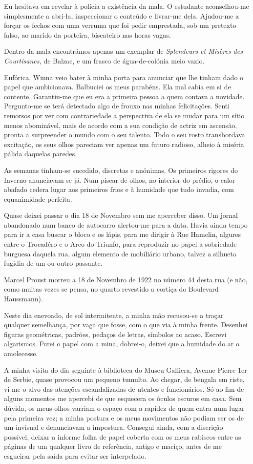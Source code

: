 Eu hesitava em revelar à polícia a existência da mala. O estudante
aconselhou-me simplesmente a abri-la, inspeccionar o conteúdo e
livrar-me dela. Ajudou-me a forçar os fechos com
uma verruma que foi pedir emprestada, sob um pretexto falso, ao marido
da porteira, biscateiro nas horas vagas.

Dentro da mala encontrámos apenas um exemplar de \emph{Splendeurs et
Misères des Courtisanes, }de Balzac, e um frasco de água-de-colónia meio
vazio.

Eufórica, Winna veio bater à minha porta para anunciar que lhe tinham
dado o papel que ambicionava. Balbuciei os meus parabéns. Ela mal cabia
em si de contente. Garantiu-me que eu era a primeira pessoa a quem contava a novidade. Pergunto-me
se terá detectado algo de frouxo nas minhas felicitações. Senti remorsos
por ver com contrariedade a perspectiva de ela se mudar para um sítio
menos abominável, mais de acordo com a sua condição de actriz em
ascensão, pronta a surpreender o mundo com o seu talento. Todo o seu
rosto transbordava excitação, os seus olhos pareciam ver apenas um
futuro radioso, alheio à miséria pálida daquelas paredes.

As semanas tinham-se sucedido, discretas e anónimas. Os primeiros
rigores do Inverno anunciavam-se já. Num piscar de olhos, no interior do
prédio, o calor abafado cedera lugar aos primeiros frios e à humidade
que tudo invadia, com equanimidade perfeita.

Quase deixei passar o dia 18 de Novembro sem me aperceber disso. Um
jornal abandonado num banco de autocarro alertou-me para a data. Havia
ainda tempo para ir a casa buscar o bloco e os lápis, para me dirigir
à Rue Hamelin, algures entre o Trocadéro e o Arco do Triunfo, para
reproduzir no papel a sobriedade burguesa daquela rua, algum elemento de
mobiliário urbano, talvez a silhueta fugidia de um ou outro passante.

Marcel Proust morreu a 18 de Novembro de 1922 no número 44 desta rua (e
não, como muitas vezes se pensa,
no quarto revestido a cortiça do Boulevard Haussmann).

Neste dia enevoado, de sol intermitente, a minha mão recusou-se a traçar
qualquer semelhança, por vaga que fosse, com o que via à minha frente.
Desenhei figuras geométricas, padrões, pedaços de letras, símbolos ao
acaso. Escrevi algarismos. Furei o papel com a mina, dobrei-o, deixei
que a humidade do ar o amolecesse.

A minha visita do dia seguinte à biblioteca do Museu Galliera, Avenue
Pierre 1er de Serbie, quase provocou um pequeno tumulto. Ao chegar, de
bengala em riste, vi-me o alvo das atenções escandalizadas de utentes e
funcionários. Só ao fim de alguns momentos me apercebi de que esquecera
os óculos escuros em casa. Sem dúvida, os meus olhos varriam o espaço
com a rapidez de quem entra num lugar pela primeira vez; a minha postura
e os meus movimentos não podiam ser os de um invisual e denunciavam a
impostura. Consegui ainda, com a discrição possível, deixar a informe
folha de papel coberta com os meus rabiscos entre as páginas de um
qualquer livro de referência, antigo e maciço, antes de me esgueirar
pela saída para evitar ser interpelado.

